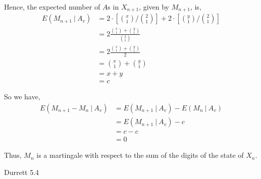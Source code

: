 \documentclass[12pt]{article}
\newenvironment{problem}[2][Problem]{\begin{trivlist}
\item[\hskip \labelsep {\bfseries #1}\hskip \labelsep {\bfseries #2.}]}{\end{trivlist}}
\begin{document}
Hence, the expected number of $A$s in $X_{n+1}$, given by $M_{n+1}$, is,
\begin{align*}
E(M_{n+1} \ | \ A_v) &= 2 \cdot \left[{x \choose 1}/{2 \choose 1}\right] + 2 \cdot \left[{y \choose 1}/{2 \choose 1}\right]\\
&= 2 \frac{{x \choose 1} + {y \choose 1}}{{2 \choose 1}}\\
&= 2 \frac{{x \choose 1} + {y \choose 1}}{2}\\
&= {x \choose 1} + {y \choose 1}\\
&= x + y\\
&= c
\end{align*}

So we have,
\begin{align*}
E(M_{n+1} - M_n \ | \ A_v) &= E(M_{n+1} \ | \ A_v) - E(M_n \ | \ A_v)\\
&= E(M_{n+1} \ | \ A_v) - c\\
&= c - c\\
&= 0
\end{align*}

Thus, $M_n$ is a martingale with respect to the sum of the digits of the state of $X_n$.

\begin{problem}{II}
Durrett 5.4
\end{problem}
\end{document}
